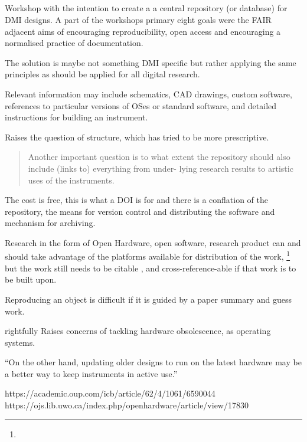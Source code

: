 \subsection{\cite{mcpherson_nimehub_2016}}

Workshop with the intention to create a a central repository (or database) for DMI designs. A part of the workshops primary eight goals were the FAIR adjacent aims of encouraging reproducibility, open access and encouraging a normalised practice of documentation.

The solution is maybe not something DMI specific but rather applying the same principles as should be applied for all digital research.

Relevant information may include schematics, CAD drawings, custom software, references to particular versions of OSes or standard software, and detailed instructions for building an instrument.

Raises the question of structure, which \cite{fiordelmondo_towards_2025} has tried to be more prescriptive.

\begin{quotation}
    Another important question is to what extent the repository should also include (links to) everything from under- lying research results to artistic uses of the instruments.
\end{quotation}

The cost is free, this is what a DOI is for and there is a conflation of the repository, the means for version control and distributing the software and mechanism for archiving.

Research in the form of Open Hardware, open software, research product can and should take advantage of the platforms available for distribution of the work,
\footnote{}
but the work still needs to be citable \cite{smith_software_2016}, and cross-reference-able \cite{stall_journal_2023} if that work is to be built upon.

Reproducing an object is difficult if it is guided by a paper summary and guess work.

\textcite{mcpherson_nimehub_2016} rightfully Raises concerns of tackling hardware obsolescence, as operating systems. 

``On the other hand, updating older designs to run on the latest hardware may be a better way to keep instruments in active use.''

https://academic.oup.com/icb/article/62/4/1061/6590044
https://ojs.lib.uwo.ca/index.php/openhardware/article/view/17830

